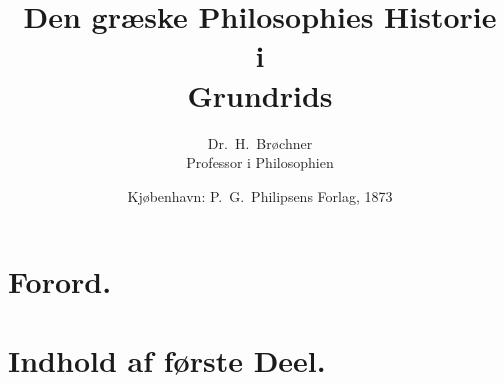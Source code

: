 \documentclass[12pt,a4paper]{book}
\title{\textbf{Den græske Philosophies Historie}\\[2pt]
  \large i\\[6pt]
  \textbf{\Large Grundrids}}
\author{Dr.\ H.\ Brøchner\\[4pt]
  \small Professor i Philosophien}
\date{Kjøbenhavn: P.\ G.\ Philipsens Forlag, 1873}
\begin{document}
\maketitle
\thispagestyle{empty}
\newpage


\chapter*{Forord.}

\chapter*{Indhold af første Deel.}
\end{document}

